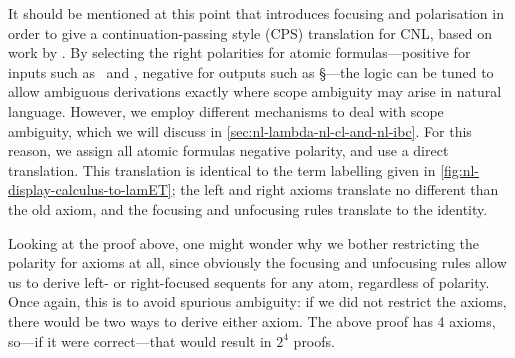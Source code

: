 It should be mentioned at this point that \citet{bastenhof2011}
introduces focusing and polarisation in order to give a
continuation-passing style (CPS) translation for CNL, based on work by
\citet{girard1991}. By selecting the right polarities for atomic
formulas---positive for inputs such as \N\ and \NP, negative for
outputs such as \S---the logic can be tuned to allow ambiguous
derivations exactly where scope ambiguity may arise in natural
language. However, we employ different mechanisms to deal with scope
ambiguity, which we will discuss
in \autoref{sec:nl-lambda-nl-cl-and-nl-ibc}. For this reason, we
assign all atomic formulas negative polarity, and use a direct
translation. This translation is identical to the term labelling given
in \autoref{fig:nl-display-calculus-to-lamET}; the left and
right axioms translate no different than the old axiom, and the
focusing and unfocusing rules translate to the identity.

Looking at the proof above, one might wonder why we bother restricting
the polarity for axioms at all, since obviously the focusing and
unfocusing rules allow us to derive left- or right-focused sequents
for any atom, regardless of polarity. Once again, this is to avoid
spurious ambiguity: if we did not restrict the axioms, there would be
two ways to derive either axiom. The above proof has 4 axioms, so---if
it were correct---that would result in $2^4$ proofs.

